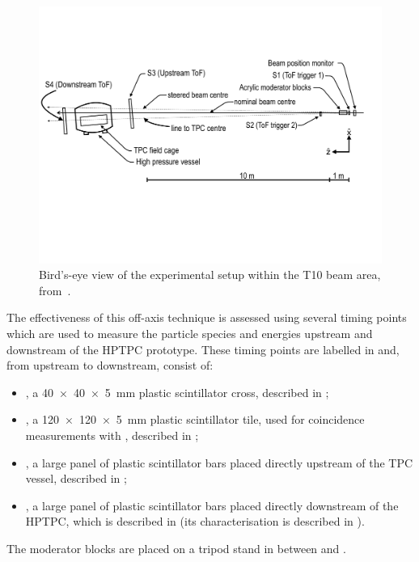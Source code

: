 \begin{figure}[h]
  \centering
  \includegraphics[width=\linewidth]{files/figures/hptpc_beam_flux/hptpc_t10_planview}
  \caption[Bird's-eye view of the experimental setup within the T10 beam area]{Bird's-eye view of the experimental setup within the T10 beam area, from~\cite{beampaper}.}
  \label{fig:beamSetup}
\end{figure}

The effectiveness of this off-axis technique is assessed using several timing points which are used to measure the particle species and energies upstream and downstream of the HPTPC prototype.
These timing points are labelled in  and, from upstream to downstream, consist of:
\begin{itemize}
    \item \SOne, a \SI{40 x 40 x 5}{\mm} plastic scintillator cross, described in ;
    \item \STwo, a \SI{120 x 120 x 5}{\mm} plastic scintillator tile, used for coincidence measurements with \SOne, described in ;
    \item \SThree, a large panel of plastic scintillator bars placed directly upstream of the TPC vessel, described in ;
    \item \SFour, a large panel of plastic scintillator bars placed directly downstream of the HPTPC, which is described in  (its characterisation is described in ).
\end{itemize}
The moderator blocks are placed on a tripod stand in between \SOne and \STwo.

